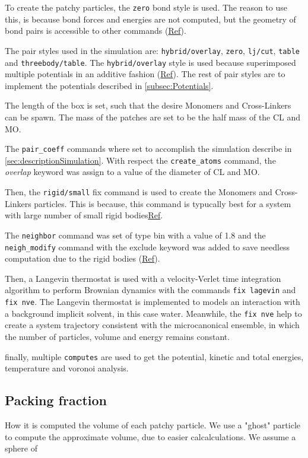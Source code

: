 \documentclass[main.tex]{subfiles}
\begin{document}
To create the patchy particles, the \verb|zero| bond style is used.
The reason to use this, is because bond forces and energies are not computed, but the geometry of bond pairs is accessible to other commands (\href{https://docs.lammps.org/bond_zero.html}{Ref}).

The pair styles used in the simulation are: \verb|hybrid/overlay|, \verb|zero|, \verb|lj/cut|, \verb|table| and \verb|threebody/table|.
The \verb|hybrid/overlay| style is used because superimposed multiple potentials in an additive fashion (\href{https://docs.lammps.org/pair_hybrid.html}{Ref}).
The rest of pair styles are to implement the potentials described in \ref{subsec:Potentials}.

The length of the box is set, such that the desire Monomers and Cross-Linkers can be spawn.
The mass of the patches are set to be the half mass of the CL and MO.

The \verb|pair_coeff| commands where set to accomplish the simulation describe in \ref{sec:descriptionSimulation}.
With respect the \verb|create_atoms| command, the \textit{overlap} keyword was assign to a value of the diameter of CL and MO.

Then, the \verb|rigid/small| fix command is used to create the Monomers and Cross-Linkers particles.
This is because, this command is typucally best for a system with large number of small rigid bodies\href{https://docs.lammps.org/fix_rigid.html}{Ref}.

The \verb|neighbor| command was set of type bin with a value of 1.8 and the \verb|neigh_modify| command with the exclude keyword was added to save needless computation due to the rigid bodies (\href{https://docs.lammps.org/neigh_modify.html}{Ref}).

Then, a Langevin thermostat is used with a velocity-Verlet time integration algorithm to perform Brownian dynamics with the commands \verb|fix lagevin| and \verb|fix nve|.
The Langevin thermostat is implemented to models an interaction with a background implicit solvent, in this case water.
Meanwhile, the \verb|fix nve| help to create a system trajectory consistent with the microcanonical ensemble, in which the number of particles, volume and energy remains constant.

finally, multiple \verb|computes| are used to get the potential, kinetic and total energies, temperature and voronoi analysis.

\subsection{Packing fraction}

How it is computed the volume of each patchy particle.
We use a "ghost" particle to compute the approximate volume, due to easier calcalculations.
We assume a sphere of
\end{document}
